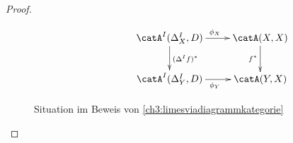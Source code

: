 \begin{proof}
\begin{figure}[b]
\begin{equation*}
\begin{gathered}
            \end{gathered}
            \hspace{2cm}
            \begin{gathered}
                \xymatrix{
                    \catA^I(\Delta^I_X, D) \ar[r]^{\phi_X} \ar[d]^{(\Delta^I f)^*} &
                    \catA(X,X) \ar[d]_{f^*}
                    \\
                    \catA^I(\Delta^I_Y, D) \ar[r]_{\phi_Y} & \catA(Y,X)
                }
            \end{gathered}
        \end{equation*}
        \caption{Situation im Beweis von \cref{ch3:limesviadiagrammkategorie}}
        \label{ch3:fig:trafos}
    \end{figure}
\end{proof}

